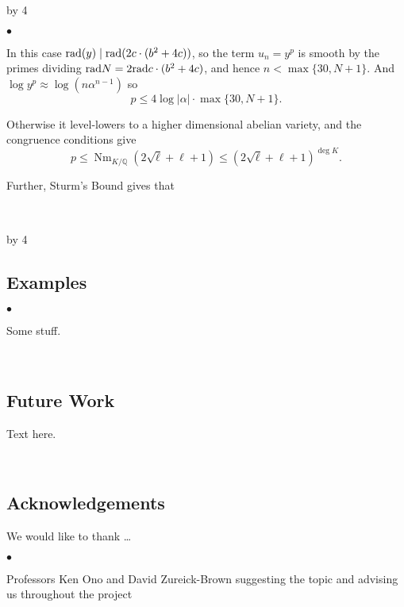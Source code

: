 \documentclass[12pt]{scrartcl}
\newenvironment{citemize}{
\begin{list}{$\bullet$}{\setlength{\itemsep}{0pt} \setlength{\rightmargin}{0pt} \setlength{\leftmargin}{0.5\labelwidth} \setlength{\topsep}{0pt}}
}{\end{list}}
\def\Q{{\mathbb Q}}
\newcommand{\rad}{{\rm{rad}}}
\newcommand{\Nm}{\operatorname{Nm}}
\def\anzspalten{4}
\newlength{\kastenwidth}
\newenvironment{kasten}{%
  \begin{lrbox}{\dummybox}%
    \begin{minipage}{0.96\linewidth}}%
    {\end{minipage}%
  \end{lrbox}%
  \raisebox{-\depth}{\psshadowbox[framesep=1em]{\usebox{\dummybox}}}\\[0.5em]}
\newenvironment{spalte}{%
  \setlength\kastenwidth{1.2\textwidth}
  \divide\kastenwidth by \anzspalten
  \begin{minipage}[t]{\kastenwidth}}{\end{minipage}\hfill}
\begin{document}
\begin{lrbox}{\spalten}
{\begin{spalte}
\begin{kasten}
\begin{citemize}
\item In this case $\rad(y) \mid \rad(2c \cdot (b^2+4c))$, so the term $u_n = y^p$ is smooth by the primes dividing $\rad{N} = 2\rad{c\cdot (b^2+4c)}$, and hence $n < \max\{30, N+1\}$.  And $\log y^p \approx \log(n \alpha^{n-1})$ so
\[p \leq 4 \log |\alpha| \cdot \max\{30, N+1\}. \]

\item Otherwise it level-lowers to a higher dimensional abelian variety, and the congruence conditions give
\[ p \leq \Nm_{K/\Q}(2\sqrt{\ell} +\ell+1) \leq (2\sqrt{\ell} +\ell+1)^{\operatorname{deg}{K}}.\]

\item Further, Sturm's Bound gives that

\end{citemize}

\end{kasten}



\end{spalte}
    \begin{spalte}
\vspace{-2.71in}




\begin{kasten}
  \subsection*{{\color{blue} \large Examples}}

\begin{citemize}
\item Some stuff.
\end{citemize}

\end{kasten}

\begin{kasten}
\subsection*{{\color{blue} \large Future Work}}
Text here.
\end{kasten}

\begin{kasten}
\subsection*{{\color{blue} Acknowledgements}}
We would like to thank \ldots
\begin{citemize}
\item Professors Ken Ono and David Zureick-Brown suggesting the topic and advising us throughout the project


\end{citemize}
\end{kasten}
\end{spalte}}
\end{lrbox}
\end{document}
